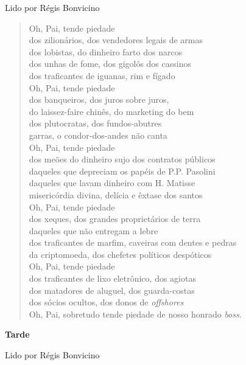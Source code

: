 Lido por Régis Bonvicino

\begin{verse}
Oh, Pai, tende piedade\\
dos zilionários, dos vendedores legais de armas\\
dos lobistas, do dinheiro farto dos narcos\\
dos unhas de fome, dos gigolôs dos cassinos\\
dos traficantes de iguanas, rim e fígado\\[5pt]
Oh, Pai, tende piedade\\
dos banqueiros, dos juros sobre juros,\\
do laissez-faire chinês, do marketing do bem\\
dos plutocratas, dos fundos-abutres\\
garras, o condor-dos-andes não canta\\[5pt]
Oh, Pai, tende piedade\\
dos meões do dinheiro sujo dos contratos públicos\\
daqueles que depreciam os papéis de P.P. Pasolini\\
daqueles que lavam dinheiro com H. Matisse\\
misericórdia divina, delícia e êxtase dos santos\\[5pt]
Oh, Pai, tende piedade\\
dos xeques, dos grandes proprietários de terra\\
daqueles que não entregam a lebre\\
dos traficantes de marfim, caveiras com dentes e pedras\\
da criptomoeda, dos chefetes políticos despóticos\\[5pt]
Oh, Pai, tende piedade\\
dos traficantes de lixo eletrônico, dos agiotas\\
dos matadores de aluguel, dos guarda-costas\\
dos sócios ocultos, dos donos de \emph{offshores}\\
Oh, Pai, sobretudo tende piedade de nosso honrado \emph{boss}.
\end{verse}

\pagebreak

\textbf{Tarde}

Lido por Régis Bonvicino


